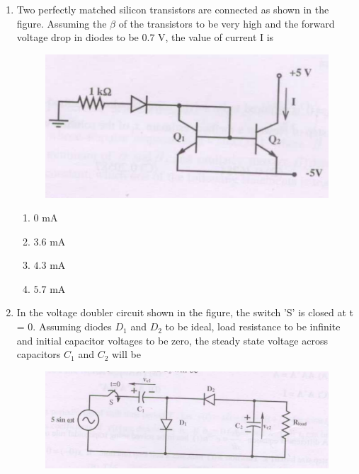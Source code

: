 \documentclass[journal,12pt,onecolumn]{IEEEtran}
\theoremstyle{remark}
\begin{document}
\begin{enumerate}[start=1, label=Q.\arabic*]
\item Two perfectly matched silicon transistors are connected as shown in the figure. Assuming the $\beta$ of the transistors to be very high and the forward voltage drop in diodes to be $0.7$ V, the value of current I is

\begin{figure}[H]
    \centering
    \includegraphics[width=\columnwidth]{Fig/q40.png}
    \caption{}
\end{figure}

\begin{multicols}{4}
\begin{enumerate}
    \item $0$ mA
    \item $3.6$ mA
    \item $4.3$ mA
    \item $5.7$ mA
\end{enumerate}
\end{multicols}


\item In the voltage doubler circuit shown in the figure, the switch 'S' is closed at t = 0. Assuming diodes $D_1$ and $D_2$ to be ideal, load resistance to be infinite and initial capacitor voltages to be zero, the steady state voltage across capacitors $C_1$ and $C_2$ will be

\begin{figure}[H]
    \centering
    \includegraphics[width=\columnwidth]{Fig/q41.png}
    \caption{}
\end{figure}


\end{enumerate}
\end{document}
